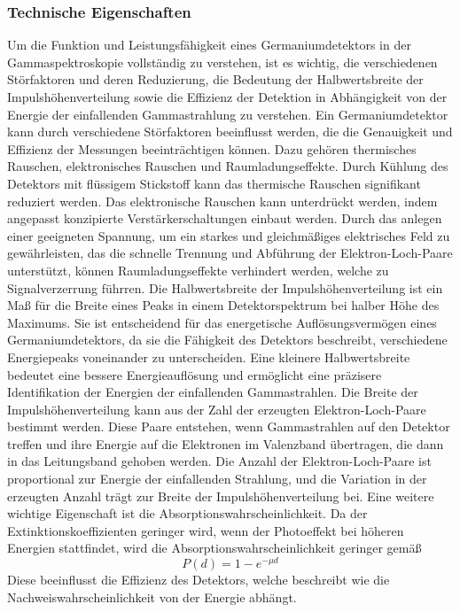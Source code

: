 \subsubsection{Technische Eigenschaften}
Um die Funktion und Leistungsfähigkeit eines Germaniumdetektors in der Gammaspektroskopie vollständig zu verstehen, ist es wichtig,
die verschiedenen Störfaktoren und deren Reduzierung, die Bedeutung der Halbwertsbreite der Impulshöhenverteilung sowie die Effizienz der Detektion in Abhängigkeit von der Energie
der einfallenden Gammastrahlung zu verstehen.
Ein Germaniumdetektor kann durch verschiedene Störfaktoren beeinflusst werden, die die Genauigkeit und Effizienz der Messungen beeinträchtigen können.
Dazu gehören thermisches Rauschen, elektronisches Rauschen und Raumladungseffekte. Durch Kühlung des Detektors mit flüssigem Stickstoff kann das thermische
Rauschen signifikant reduziert werden. Das elektronische Rauschen kann unterdrückt werden, indem angepasst konzipierte Verstärkerschaltungen einbaut werden. Durch das 
anlegen einer geeigneten Spannung, um ein starkes und gleichmäßiges elektrisches Feld zu gewährleisten, das die schnelle Trennung und Abführung der Elektron-Loch-Paare
unterstützt, können Raumladungseffekte verhindert werden, welche zu Signalverzerrung führren. Die Halbwertsbreite der Impulshöhenverteilung ist ein Maß für die Breite eines Peaks 
in einem Detektorspektrum bei halber Höhe des Maximums. Sie ist entscheidend für das energetische Auflösungsvermögen eines Germaniumdetektors, da sie die Fähigkeit des Detektors
beschreibt, verschiedene Energiepeaks voneinander zu unterscheiden. Eine kleinere Halbwertsbreite bedeutet eine bessere Energieauflösung und ermöglicht eine präzisere
Identifikation der Energien der einfallenden Gammastrahlen.
Die Breite der Impulshöhenverteilung kann aus der Zahl der erzeugten Elektron-Loch-Paare bestimmt werden. Diese Paare entstehen, wenn Gammastrahlen auf den Detektor
treffen und ihre Energie auf die Elektronen im Valenzband übertragen, die dann in das Leitungsband gehoben werden. Die Anzahl der Elektron-Loch-Paare ist proportional 
zur Energie der einfallenden Strahlung, und die Variation in der erzeugten Anzahl trägt zur Breite der Impulshöhenverteilung bei.
Eine weitere wichtige Eigenschaft ist die Absorptionswahrscheinlichkeit. Da der Extinktionskoeffizienten geringer wird, wenn der Photoeffekt bei höheren Energien stattfindet,
wird die Absorptionswahrscheinlichkeit geringer gemäß
\begin{equation}
    P(d)=1-e^{-\mu d}
    \label{eq:Absorptionswahrscheinlichkeit}
\end{equation}    
Diese beeinflusst die Effizienz des Detektors, welche beschreibt wie die Nachweiswahrscheinlichkeit von der Energie abhängt.

